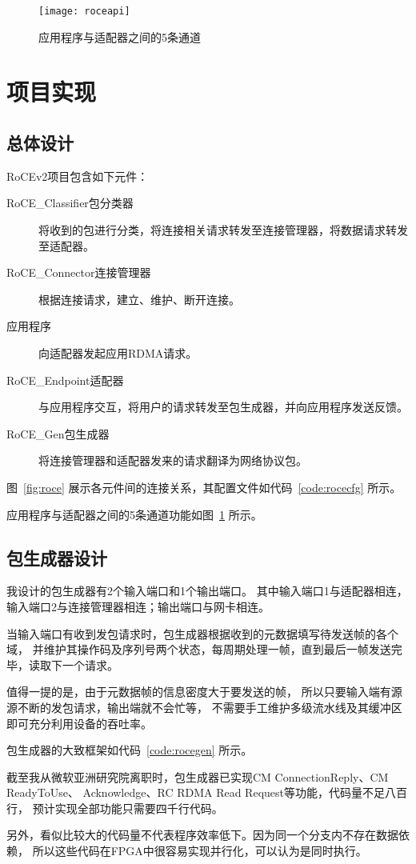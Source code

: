 \begin{figure}[htbp]
\centering

\end{figure}

\begin{figure}[htbp]
\centering
\texttt{[image: roceapi]}
\caption{应用程序与适配器之间的5条通道} \label{fig:roceapi}
\end{figure}
\section{项目实现}
\subsection{总体设计}
RoCEv2项目包含如下元件：
\begin{description}
\item[RoCE\_Classifier包分类器]将收到的包进行分类，将连接相关请求转发至连接管理器，将数据请求转发至适配器。
\item[RoCE\_Connector连接管理器]根据连接请求，建立、维护、断开连接。
\item[应用程序]向适配器发起应用RDMA请求。
\item[RoCE\_Endpoint适配器]与应用程序交互，将用户的请求转发至包生成器，并向应用程序发送反馈。
\item[RoCE\_Gen包生成器]将连接管理器和适配器发来的请求翻译为网络协议包。
\end{description}

图~\ref{fig:roce} 展示各元件间的连接关系，其配置文件如代码~\ref{code:rocecfg} 所示。

应用程序与适配器之间的5条通道功能如图~\ref{fig:roceapi} 所示。

\subsection{包生成器设计}
我设计的包生成器有2个输入端口和1个输出端口。
其中输入端口1与适配器相连，输入端口2与连接管理器相连；输出端口与网卡相连。

当输入端口有收到发包请求时，包生成器根据收到的元数据填写待发送帧的各个域，
并维护其操作码及序列号两个状态，每周期处理一帧，直到最后一帧发送完毕，读取下一个请求。

值得一提的是，由于元数据帧的信息密度大于要发送的帧，
所以只要输入端有源源不断的发包请求，输出端就不会忙等，
不需要手工维护多级流水线及其缓冲区即可充分利用设备的吞吐率。

包生成器的大致框架如代码~\ref{code:rocegen} 所示。


截至我从微软亚洲研究院离职时，包生成器已实现CM ConnectionReply、CM ReadyToUse、
Acknowledge、RC RDMA Read Request等功能，代码量不足八百行，
预计实现全部功能只需要四千行代码。

另外，看似比较大的代码量不代表程序效率低下。因为同一个分支内不存在数据依赖，
所以这些代码在FPGA中很容易实现并行化，可以认为是同时执行。
